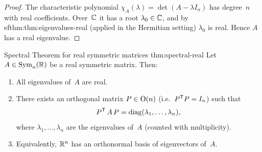\begin{proof}
The characteristic polynomial $\chi_A(\lambda) = \det(A - \lambda I_n)$
has degree~$n$ with real coefficients.  Over~${\mathbb{C}}$ it has a root
$\lambda_0\in{\mathbb{C}}$, and by 
ef{thm:thm:eigenvalues-real} (applied in the
Hermitian setting) $\lambda_0$ is real.  Hence $A$ has a real eigenvalue.
\end{proof}

\begin{theorem}{Spectral Theorem for real symmetric matrices}%
{thm:spectral-real}
Let $A\in\operatorname{Sym}_n({\mathbb{R}})$ be a real symmetric matrix.  Then:
\begin{enumerate}[label=\textup{(\roman*)}]
  \item All eigenvalues of~$A$ are real.
  \item There exists an orthogonal matrix $P\in\operatorname{O}(n)$
    (i.e.\ ${P}^{\mathsf{T}}P = I_n$) such that
    \[
      {P}^{\mathsf{T}}\,A\,P = \operatorname{diag}(\lambda_1,\ldots,\lambda_n),
    \]
    where $\lambda_1,\ldots,\lambda_n$ are the eigenvalues of~$A$
    (counted with multiplicity).
  \item Equivalently, ${\mathbb{R}}^n$ has an orthonormal basis of eigenvectors
    of~$A$.
\end{enumerate}
\end{theorem}


